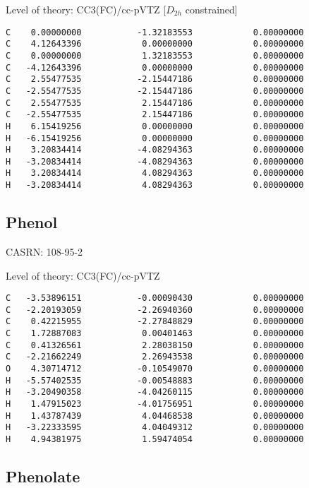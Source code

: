 \documentclass[journal=jctcce,manuscript=article,layout=traditional]{achemso}
\newcommand{\TZ}{cc-pVTZ}
\begin{document}
\begin{singlespace}
\noindent Level of theory: CC3(FC)/{\TZ} [$D_{2h}$ constrained]
\begin{verbatim}
C    0.00000000           -1.32183553            0.00000000 
C    4.12643396            0.00000000            0.00000000 
C    0.00000000            1.32183553            0.00000000 
C   -4.12643396            0.00000000            0.00000000 
C    2.55477535           -2.15447186            0.00000000 
C   -2.55477535           -2.15447186            0.00000000 
C    2.55477535            2.15447186            0.00000000 
C   -2.55477535            2.15447186            0.00000000 
H    6.15419256            0.00000000            0.00000000 
H   -6.15419256            0.00000000            0.00000000 
H    3.20834414           -4.08294363            0.00000000 
H   -3.20834414           -4.08294363            0.00000000 
H    3.20834414            4.08294363            0.00000000 
H   -3.20834414            4.08294363            0.00000000 
\end{verbatim}
\end{singlespace}

\subsection{Phenol}

CASRN: 108-95-2

\begin{singlespace}
\noindent Level of theory: CC3(FC)/{\TZ}
\begin{verbatim}
C   -3.53896151           -0.00090430            0.00000000
C   -2.20193059           -2.26940360            0.00000000
C    0.42215955           -2.27848829            0.00000000
C    1.72887083            0.00401463            0.00000000
C    0.41326561            2.28038150            0.00000000
C   -2.21662249            2.26943538            0.00000000
O    4.30714712           -0.10549070            0.00000000
H   -5.57402535           -0.00548883            0.00000000
H   -3.20490358           -4.04260115            0.00000000
H    1.47915023           -4.01756951            0.00000000
H    1.43787439            4.04468538            0.00000000
H   -3.22333595            4.04049312            0.00000000
H    4.94381975            1.59474054            0.00000000
\end{verbatim}
\end{singlespace}

\subsection{Phenolate}
\end{document}
